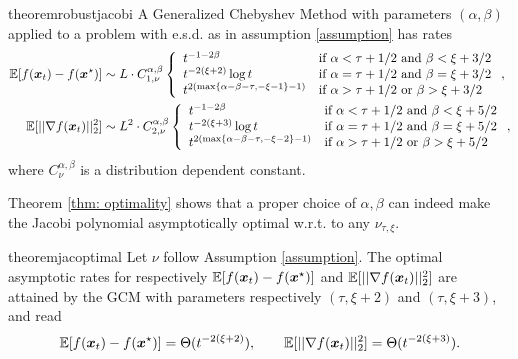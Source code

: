 \documentclass{article}
\begin{document}
\begin{restatable}{theorem}{robustjacobi}\label{thm: jacobirates}
A Generalized Chebyshev Method with parameters $(\alpha,\beta)$ applied to a problem with e.s.d. as in assumption \ref{assumption} has rates
\begin{align}
\mathbb{E}[f({\boldsymbol x}_t)-f({\boldsymbol x}^\star)]&\sim L\cdot C^{\alpha,\beta}_{1,\nu}
    \left\{\begin{array}{ll}
    t^{-1-2\beta} &\mbox{if } 
		  \alpha<\tau+1/2 \text{ and } \beta <\xi+3/2\\
		  t^{-2(\xi+2)}\log t& \mbox{if } 
		  \alpha=\tau+1/2 \text{ and } \beta =\xi+3/2\\
		  t^{2(\max\{\alpha-\beta-\tau,-\xi-1\}-1)}& \mbox{if } 
		  \alpha>\tau+1/2 \text{ or } \beta >\xi+3/2
	\end{array}\right. ,\\
	\mathbb{E}[||\nabla f({\boldsymbol x}_t)||^2_2]&\sim L^2\cdot C^{\alpha,\beta}_{2,\nu}
        \left\{\begin{array}{ll}
    t^{-1-2\beta} &\mbox{if } 
		  \alpha<\tau+1/2 \text{ and } \beta <\xi+5/2\\
		  t^{-2(\xi+3)}\log t& \mbox{if } 
		  \alpha=\tau+1/2 \text{ and } \beta =\xi+5/2\\
		  t^{2(\max\{\alpha-\beta-\tau,-\xi-2\}-1)}& \mbox{if } 
		  \alpha>\tau+1/2 \text{ or } \beta >\xi+5/2
	\end{array}\right. ,
\end{align}
where $C^{\alpha,\beta}_\nu$ is a distribution dependent constant.
\end{restatable}

Theorem \ref{thm: optimality} shows that a proper choice of $\alpha,\beta$ can indeed make the Jacobi polynomial asymptotically optimal w.r.t. to any $\nu_{\tau,\xi}$. 

\begin{restatable}{theorem}{jacoptimal}\label{thm: optimality}
Let $\nu$ follow Assumption \ref{assumption}.
The optimal asymptotic rates for respectively $\mathbb{E}[f({\boldsymbol x}_t)-f({\boldsymbol x}^\star)]$ and $\mathbb{E}[||\nabla f({\boldsymbol x}_t)||^2_2]$ are attained by the GCM with parameters respectively $(\tau,\xi+2)$ and $(\tau,\xi+3)$, and read
\[
    \mathbb{E}[f({\boldsymbol x}_t)-f({\boldsymbol x}^\star)] = \Theta(t^{-2(\xi+2)}), \qquad \mathbb{E}[||\nabla f({\boldsymbol x}_t)||^2_2] = \Theta(t^{-2(\xi+3)}).
\]

\end{restatable}
\end{document}
